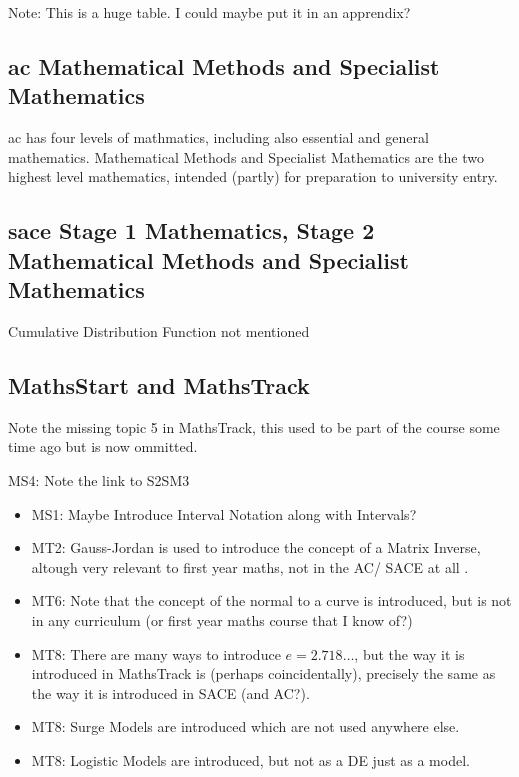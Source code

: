 \documentclass[twoside,12pt,a4paper]{report}
\begin{document}
Note: This is a huge table. I could maybe put it in an apprendix?




\subsection{\gls{ac} Mathematical Methods and Specialist Mathematics}

 \gls{ac} has four levels of mathmatics, including also essential and general mathematics. Mathematical Methods and Specialist Mathematics are the two highest level mathematics, intended (partly) for preparation to university entry.

\subsection{\gls{sace} Stage 1 Mathematics, Stage 2 Mathematical Methods and Specialist Mathematics}

Cumulative Distribution Function not mentioned


\subsection{MathsStart and MathsTrack}

Note the missing topic 5 in MathsTrack, this used to be part of the course some time ago but is now ommitted.

MS4: Note the link to S2SM3 


\begin{itemize}
	\item MS1: Maybe Introduce Interval Notation along with Intervals?
	\item MT2: Gauss-Jordan is used to introduce the concept of a Matrix Inverse, altough very relevant to first year maths, not in the AC/ SACE at all .
	\item MT6: Note that the concept of the normal to a curve is introduced, but is not in any curriculum (or first year maths course that I know of?)
	\item MT8: There are many ways to introduce $e = 2.718\hdots$, but the way it is introduced in MathsTrack is (perhaps coincidentally), precisely the same as the way it is introduced in SACE (and AC?).
	\item MT8: Surge Models are introduced which are not used anywhere else.
	\item MT8: Logistic Models are introduced, but not as a DE just as a model.
\end{itemize}
\end{document}
